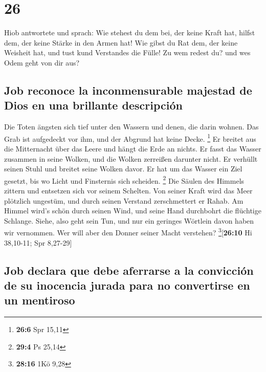 \hypertarget{section-25}{%
\section{26}\label{section-25}}

 Hiob antwortete und sprach:  Wie stehest du
dem bei, der keine Kraft hat, hilfst dem, der keine Stärke in den Armen
hat!  Wie gibst du Rat dem, der keine Weisheit hat, und
tust kund Verstandes die Fülle!  Zu wem redest du? und wes
Odem geht von dir aus?

\hypertarget{job-reconoce-la-inconmensurable-majestad-de-dios-en-una-brillante-descripciuxf3n}{%
\subsection{Job reconoce la inconmensurable majestad de Dios en una
brillante
descripción}\label{job-reconoce-la-inconmensurable-majestad-de-dios-en-una-brillante-descripciuxf3n}}

 Die Toten ängsten sich tief unter den Wassern und denen,
die darin wohnen.  Das Grab ist aufgedeckt vor ihm, und
der Abgrund hat keine Decke. \footnote{\textbf{26:6} Spr 15,11}
 Er breitet aus die Mitternacht über das Leere und hängt
die Erde an nichts.  Er fasst das Wasser zusammen in seine
Wolken, und die Wolken zerreißen darunter nicht.  Er
verhüllt seinen Stuhl und breitet seine Wolken davor.  Er
hat um das Wasser ein Ziel gesetzt, bis wo Licht und Finsternis sich
scheiden. \footnote{\textbf{29:4} Ps 25,14}  Die Säulen
des Himmels zittern und entsetzen sich vor seinem Schelten.
 Von seiner Kraft wird das Meer plötzlich ungestüm, und
durch seinen Verstand zerschmettert er Rahab.  Am Himmel
wird's schön durch seinen Wind, und seine Hand durchbohrt die flüchtige
Schlange.  Siehe, also geht sein Tun, und nur ein
geringes Wörtlein davon haben wir vernommen. Wer will aber den Donner
seiner Macht verstehen? \footnote{\textbf{28:16} 1Kö 9,28}{[}\textbf{26:10}
Hi 38,10-11; Spr 8,27-29{]}

\hypertarget{job-declara-que-debe-aferrarse-a-la-convicciuxf3n-de-su-inocencia-jurada-para-no-convertirse-en-un-mentiroso}{%
\subsection{Job declara que debe aferrarse a la convicción de su
inocencia jurada para no convertirse en un
mentiroso}\label{job-declara-que-debe-aferrarse-a-la-convicciuxf3n-de-su-inocencia-jurada-para-no-convertirse-en-un-mentiroso}}

